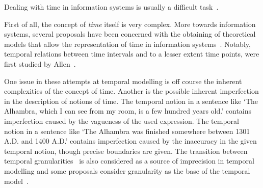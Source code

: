 Dealing with time in information systems is usually a difficult task~\cite{Bolour82}.

First of all, the concept of \emph{time} itself is very complex. More towards information systems, several proposals have been concerned with the obtaining of theoretical models that allow the representation of time in information systems~\cite{Cru97}. Notably, temporal relations between time intervals and to a lesser extent time points, were first studied by Allen~\cite{Allen83}.


One issue in these attempts at temporal modelling is off course the inherent complexities of the concept of time. Another is the possible inherent imperfection in the description of notions of time. The temporal notion in a sentence like `The Alhambra, which I can see from my room, is a few hundred years old.' contains imperfection caused by the vagueness of the used expression. The temporal notion in a sentence like `The Alhambra was finished somewhere between 1301 A.D. and 1400 A.D.' contains imperfection caused by the inaccuracy in the given temporal notion, though precise boundaries are given. The transition between temporal granularities~\cite{Lin97} is also considered as a source of imprecision in temporal modelling and some proposals consider granularity as the base of the temporal model~\cite{Cru97}.


